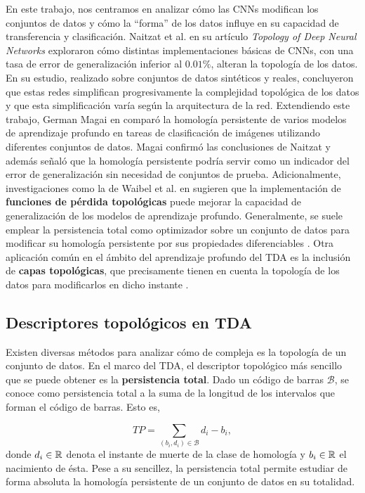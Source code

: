 En este trabajo, nos centramos en analizar cómo las CNNs modifican los conjuntos de datos y cómo la \enquote{forma} de los datos influye en su capacidad de transferencia y clasificación. Naitzat et al. en su artículo \textit{Topology of Deep Neural Networks} \cite{naitzat2020topology} exploraron cómo distintas implementaciones básicas de CNNs, con una tasa de error de generalización inferior al $0.01\%$, alteran la topología de los datos. En su estudio, realizado sobre conjuntos de datos sintéticos y reales, concluyeron que estas redes simplifican progresivamente la complejidad topológica de los datos y que esta simplificación varía según la arquitectura de la red. Extendiendo este trabajo, German Magai en \cite{magai2023deep} comparó la homología persistente de varios modelos de aprendizaje profundo en tareas de clasificación de imágenes utilizando diferentes conjuntos de datos. Magai confirmó las conclusiones de Naitzat y además señaló que la homología persistente podría servir como un indicador del error de generalización sin necesidad de conjuntos de prueba. Adicionalmente, investigaciones como la de Waibel et al. en \cite{waibel2022capturing} sugieren que la implementación de \textbf{funciones de pérdida topológicas} puede mejorar la capacidad de generalización de los modelos de aprendizaje profundo. Generalmente, se suele emplear la persistencia total como optimizador sobre un conjunto de datos para modificar su homología persistente por sus propiedades diferenciables \cite{bibid}. Otra aplicación común en el ámbito del aprendizaje profundo del TDA es la inclusión de \textbf{capas topológicas}, que precisamente tienen en cuenta la topología de los datos para modificarlos en dicho instante \cite{bibid}.%

\subsection{Descriptores topológicos en TDA}

Existen diversas métodos para analizar cómo de compleja es la topología de un conjunto de datos. En el marco del TDA, el descriptor topológico más sencillo que se puede obtener es la \textbf{persistencia total}. Dado un código de barras $\mathcal{B}$, se conoce como persistencia total a la suma de la longitud de los intervalos que forman el código de barras. Esto es,

\[
TP = \sum_{(b_i,d_i) \in \mathcal{B}} d_i - b_i,
\]
donde $d_i \in \mathbb{R}$ denota el instante de muerte de la clase de homología y $b_i \in \mathbb{R}$ el nacimiento de ésta. Pese a su sencillez, la persistencia total permite estudiar de forma absoluta la homología persistente de un conjunto de datos en su totalidad.

